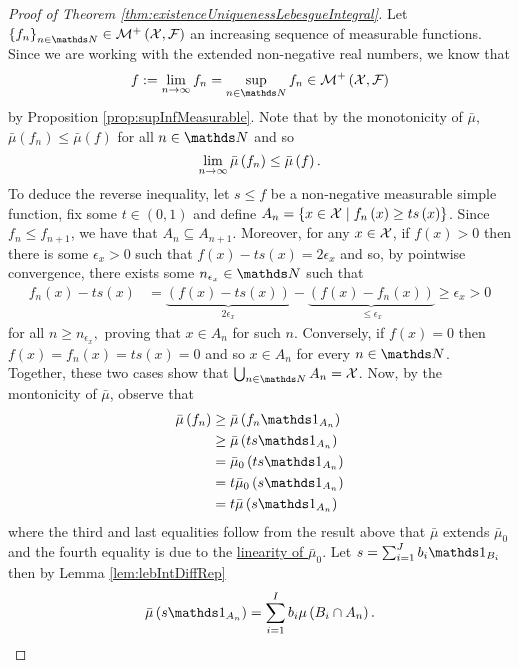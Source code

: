 \begin{proof}[Proof of Theorem \ref{thm:existenceUniquenessLebesgueIntegral}]
Let $\left\{ f_{n}\right\} _{n\in\N}\in\nonnegMeasurableFunctions$
an increasing sequence of measurable functions. Since we are working
with the extended non-negative real numbers, we know that 
\[
f:=\lim_{n\to\infty}f_{n}=\sup_{n\in\N}f_{n}\in\nonnegMeasurableFunctions
\]
by Proposition \ref{prop:supInfMeasurable}. Note that by the monotonicity
of $\bar{\mu},$ $\bar{\mu}\left(f_{n}\right)\leq\bar{\mu}\left(f\right)$
for all $n\in\N$ and so 
\[
\lim_{n\to\infty}\bar{\mu}\left(f_{n}\right)\leq\bar{\mu}\left(f\right).
\]
To deduce the reverse inequality, let $s\leq f$ be a non-negative
measurable simple function, fix some $t\in\left(0,1\right)$ and define
$A_{n}=\left\{ x\in\mathcal{X}\mid f_{n}\left(x\right)\geq ts\left(x\right)\right\} $.
Since $f_{n}\leq f_{n+1}$, we have that $A_{n}\subseteq A_{n+1}$.
Moreover, for any $x\in\mathcal{X}$, if $f\left(x\right)>0$ then there is
some $\epsilon_{x}>0$ such that $f\left(x\right)-ts\left(x\right)=2\epsilon_{x}$
and so, by pointwise convergence, there exists some $n_{\epsilon_{x}}\in\N$
such that 
\begin{align*}
f_{n}\left(x\right)-ts\left(x\right) & =\underbrace{\left(f\left(x\right)-ts\left(x\right)\right)}_{2\epsilon_{x}}-\underbrace{\left(f\left(x\right)-f_{n}\left(x\right)\right)}_{\leq\epsilon_{x}}\geq\epsilon_{x}>0
\end{align*}
for all $n\geq n_{\epsilon_{x}},$ proving that $x\in A_{n}$ for
such $n.$ Conversely, if $f\left(x\right)=0$ then $f\left(x\right)=f_{n}\left(x\right)=ts\left(x\right)=0$
and so $x\in A_{n}$ for every $n\in\N$. Together, these two cases
show that $\bigcup_{n\in\N}A_{n}=\X$. Now, by the montonicity of
$\bar{\mu}$, observe that
\begin{align}
\lebInt{\mu}{f_{n}} & \geq\lebInt{\mu}{f_{n}\indicate_{A_{n}}}\nonumber \\
 & \geq\lebInt{\mu}{ts\indicate_{A_{n}}}\nonumber \\
 & =\bar{\mu}_{0}\left(ts\indicate_{A_{n}}\right)\nonumber \\
 & =t\bar{\mu}_{0}\left(s\indicate_{A_{n}}\right)\nonumber \\
 & =t\lebInt{\mu}{s\indicate_{A_{n}}}\label{eq:monotoneConvPointwiseEq}
\end{align}
where the third and last equalities follow from the result above that
$\bar{\mu}$ extends $\bar{\mu}_{0}$ and the fourth equality is due
to the \hyperref[prop:lebIntLinearitySimpleFunc]{linearity of $\bar{\mu}_0$}.
Let $s=\sum_{i=1}^{J}b_{i}\indicate_{B_{i}}$then by Lemma \ref{lem:lebIntDiffRep}
\[
\bar{\mu}\left(s\indicate_{A_{n}}\right)=\sum_{i=1}^{I}b_{i}\mu\left(B_{i}\cap A_{n}\right).
\]
\end{proof}
